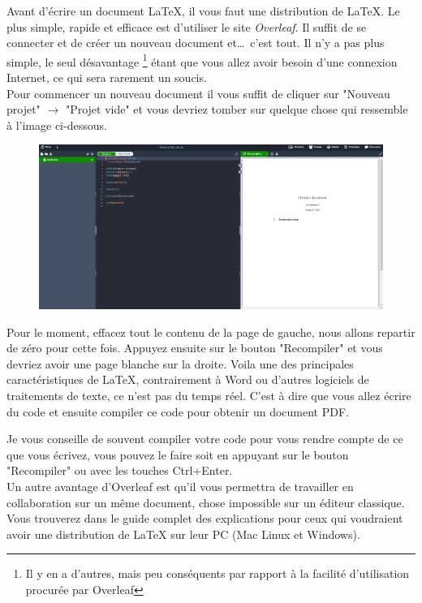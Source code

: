 \documentclass[11pt]{article}				%
\begin{document}
Avant d'écrire un document LaTeX, il vous faut une distribution de LaTeX. Le plus simple, rapide et efficace est d'utiliser le site \textit{Overleaf}. Il suffit de se connecter et de créer un nouveau document et\dots \ c'est tout. Il n'y a pas plus simple, le seul désavantage \footnote{Il y en a d'autres, mais peu conséquents par rapport à la facilité d'utilisation procurée par Overleaf} étant que vous allez avoir besoin d'une connexion Internet, ce qui sera rarement un soucis.\\
Pour commencer un nouveau document il vous suffit de cliquer sur "Nouveau projet" $\longrightarrow$ "Projet vide" et vous devriez tomber sur quelque chose qui ressemble à l'image ci-dessous.\\
\begin{figure}[h!]
	\centering
	\includegraphics[scale=0.25]{ressources/overleaf_projet_vide.png}
\end{figure}	
\newline

Pour le moment, effacez tout le contenu de la page de gauche, nous  allons repartir de zéro pour cette fois. Appuyez ensuite sur le bouton "Recompiler" et vous devriez avoir une page blanche sur la droite.
Voila une des principales caractéristiques de LaTeX, contrairement à Word ou d'autres logiciels de traitements de texte, ce n'est pas du temps réel. C'est à dire que vous allez écrire du code et ensuite compiler ce code pour obtenir un document PDF. 

Je vous conseille de souvent compiler votre code pour vous rendre compte de ce que vous écrivez, vous pouvez le faire soit en appuyant sur le bouton "Recompiler" ou avec les touches Ctrl+Enter.\\



Un autre avantage d'Overleaf est qu'il vous permettra de travailler en collaboration sur un même document, chose impossible sur un éditeur classique.
Vous trouverez dans le guide complet des explications pour ceux qui voudraient avoir une distribution de LaTeX sur leur PC (Mac Linux et Windows).
\end{document}
